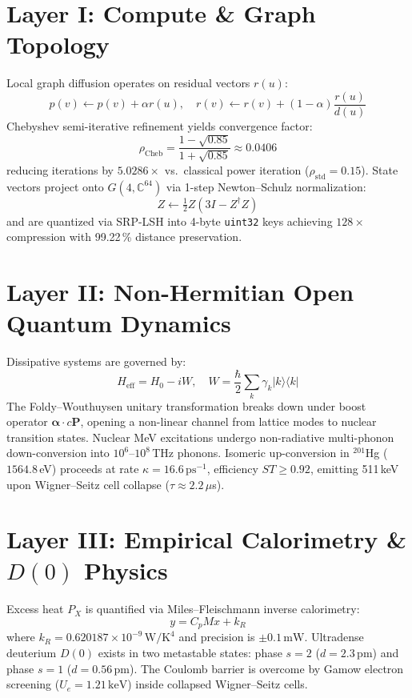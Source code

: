 \documentclass[10pt,twocolumn]{article}
\begin{document}
\section{Layer I: Compute \& Graph Topology}
Local graph diffusion operates on residual vectors $r(u)$:
\begin{equation}
  p(v)\leftarrow p(v)+\alpha r(u),\quad
  r(v)\leftarrow r(v)+(1-\alpha)\frac{r(u)}{d(u)}
\end{equation}
Chebyshev semi-iterative refinement yields convergence factor:
\begin{equation}
  \rho_{\mathrm{Cheb}}=\frac{1-\sqrt{0.85}}{1+\sqrt{0.85}}\approx 0.0406
\end{equation}
reducing iterations by $5.0286\times$ vs.\ classical power iteration
($\rho_{\mathrm{std}}=0.15$). State vectors project onto $G(4,\mathbb{C}^{64})$
via 1-step Newton--Schulz normalization:
\begin{equation}
  Z\leftarrow\tfrac{1}{2}Z\!\left(3I-Z^\dagger Z\right)
\end{equation}
and are quantized via SRP-LSH into 4-byte \texttt{uint32} keys achieving
$128\times$ compression with 99.22\,\% distance preservation.

\section{Layer II: Non-Hermitian Open Quantum Dynamics}
Dissipative systems are governed by:
\begin{equation}
  H_{\mathrm{eff}}=H_0-iW,\quad W=\frac{\hbar}{2}\sum_k\gamma_k|k\rangle\langle k|
\end{equation}
The Foldy--Wouthuysen unitary transformation breaks down under boost operator
$\boldsymbol{\alpha}\cdot c\mathbf{P}$, opening a non-linear channel from
lattice modes to nuclear transition states. Nuclear MeV excitations undergo
non-radiative multi-phonon down-conversion into $10^6$--$10^8$\,THz phonons.
Isomeric up-conversion in $^{201}$Hg ($1564.8$\,eV) proceeds at rate
$\kappa=16.6\,\mathrm{ps}^{-1}$, efficiency $ST\ge0.92$, emitting 511\,keV
upon Wigner--Seitz cell collapse ($\tau\approx2.2\,\mu$s).

\section{Layer III: Empirical Calorimetry \& $D(0)$ Physics}
Excess heat $P_X$ is quantified via Miles--Fleischmann inverse calorimetry:
\begin{equation}
  y = C_p M x + k_R
\end{equation}
where $k_R=0.620187\times10^{-9}\,\mathrm{W/K^4}$ and precision is
$\pm0.1\,\mathrm{mW}$. Ultradense deuterium $D(0)$ exists in two metastable
states: phase $s=2$ ($d=2.3\,\mathrm{pm}$) and phase $s=1$
($d=0.56\,\mathrm{pm}$). The Coulomb barrier is overcome by Gamow electron
screening ($U_e=1.21\,\mathrm{keV}$) inside collapsed Wigner--Seitz cells.
\end{document}
